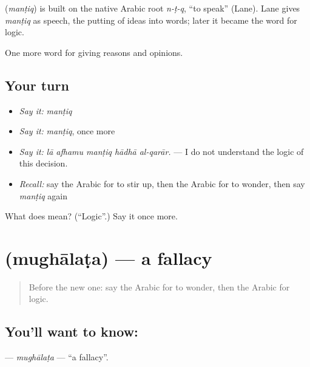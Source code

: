 \begin{cousinweb}
\textbf{} (\emph{manṭiq}) is built on the native Arabic root \emph{n-ṭ-q}, \textquotedblleft{}to speak\textquotedblright{} (Lane). Lane gives \emph{manṭiq} as speech, the putting of ideas into words; later it became the word for logic.
\end{cousinweb}

\begin{grammarlens}[title={What you've built}]
One more word for giving reasons and opinions.
\end{grammarlens}

\subsection*{Your turn}
\begin{itemize}
\raggedright
  \item \emph{Say it:} \emph{manṭiq}
  \item \emph{Say it:} \emph{manṭiq}, once more
  \item \emph{Say it:} \emph{lā afhamu manṭiq hādhā al-qarār.} — I do not understand the logic of this decision.
  \item \emph{Recall:} say the Arabic for to stir up, then the Arabic for to wonder, then say \emph{manṭiq} again
\end{itemize}

\begin{tcolorbox}[breakable,colback=teal!4,colframe=teal!35!black,title={Before you move on}]
What does  mean? (\textquotedblleft{}Logic\textquotedblright{}.) Say it once more.
\end{tcolorbox}
\section[\texorpdfstring{\ar{مغالطة} (mughālaṭa)}{مغالطة (mughālaṭa)}]{ (mughālaṭa) — a fallacy}

\label{lesson:AR-C362-mughalata}



\begin{quote}
Before the new one: say the Arabic for to wonder, then the Arabic for logic.
\end{quote}

\subsection*{You'll want to know: }
\textbf{} — \emph{mughālaṭa} — \textquotedblleft{}a fallacy\textquotedblright{}.

